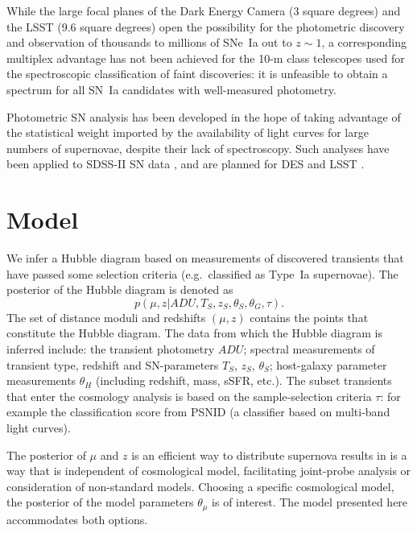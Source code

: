 \documentclass[preprint]{elsarticle}
\begin{document}
While the large focal planes of the Dark Energy Camera (3 square degrees)
and the LSST (9.6 square degrees) open the
possibility for the photometric discovery and observation of thousands to millions
of SNe~Ia out to $z\sim1$, a corresponding multiplex advantage has not been
achieved for the 10-m
class telescopes used for the spectroscopic classification of faint discoveries:
it is unfeasible to obtain a spectrum for all SN~Ia candidates with well-measured
photometry.

Photometric SN analysis has been developed
in the hope of taking advantage of the statistical weight imported by the
availability of light curves
for large numbers of supernovae, despite their lack of spectroscopy.
Such analyses have been applied to SDSS-II SN data \citep{2012ApJ...752...79H,
2013ApJ...763...88C}, and are planned for
DES \citep{2012ApJ...753..152B} and LSST \citep{2012arXiv1211.0310L}.

\section{Model}
We infer a Hubble diagram based on measurements of discovered transients
that have passed some selection criteria (e.g.\ classified as Type~Ia supernovae).  The posterior
of the Hubble diagram is denoted as
\begin{equation}
p({\mu},{z} |  {{ADU}}, {{T}}_S,{{z}}_S,
{{\theta}}_S, \theta_G, \tau).
\label{hd:eqn}
\end{equation}
The set of distance moduli
and redshifts $(\mu, z)$ contains the points that constitute the Hubble diagram.  The
data
from which the Hubble diagram is inferred include:
the transient photometry ${ADU}$; spectral measurements of
transient
type, redshift and SN-parameters ${T}_S$, ${z}_S$, ${\theta}_S$;
host-galaxy parameter measurements $\theta_H$ (including redshift,
mass, sSFR, etc.).  
The subset transients that enter the cosmology
analysis is based on the sample-selection criteria $\tau$: for example
the classification score from PSNID (a classifier based on multi-band
light curves).

The posterior of $\mu$ and $z$ is an efficient way
to distribute supernova results in is a way that is independent of cosmological model,
facilitating joint-probe analysis or consideration of non-standard models.  Choosing
a specific cosmological model, the posterior of the model parameters $\theta_\mu$
is of interest.  The model presented here accommodates both options.
\end{document}

